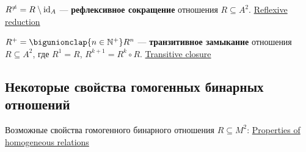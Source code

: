 \documentclass[a4paper,10pt]{article}
\begin{document}
\begin{terms}

    \item $R^{\neq} = R \setminus \mathrm{id}_{A}$ --- \textbf{рефлексивное сокращение} отношения $R \subseteq A^2$.
    \hfill\href{https://en.wikipedia.org/wiki/Reflexive_reduction}{Reflexive reduction}


    \item $R^{+} = \bigunionclap{n \in \NaturalPlus} R^n$ --- \textbf{транзитивное замыкание} отношения $R \subseteq A^2$, где $R^1 = R$, $R^{k+1} = R^k \circ R$.
    \hfill\href{https://en.wikipedia.org/wiki/Transitive_closure}{Transitive closure}

\end{terms}


\newpage


\subsection{Некоторые свойства гомогенных бинарных отношений}

Возможные свойства гомогенного бинарного отношения $R \subseteq M^2$:
\hfill\href{https://en.wikipedia.org/wiki/Homogeneous_relation#Properties}{Properties of homogeneous relations}
\end{document}
